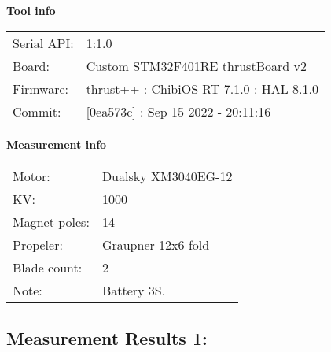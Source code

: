 \documentclass[10pt]{article}
\begin{document}
\noindent
{\large \bf Tool info}
\vspace{3mm}

\noindent
\begin{tabular}{ll}
Serial API:  & 1:1.0\\ 
Board:       & Custom STM32F401RE thrustBoard v2\\ 
Firmware:    & thrust++ : ChibiOS RT 7.1.0 : HAL 8.1.0\\ 
Commit:      & [0ea573c] : Sep 15 2022 - 20:11:16
\end{tabular}
\vspace{3mm}

\noindent
{\large \bf Measurement info}
\vspace{3mm}

\noindent
\begin{tabular}{ll}
Motor:        & Dualsky XM3040EG-12\\ 
KV:           & 1000\\ 
Magnet poles: & 14\\ 
Propeler:     & Graupner 12x6 fold\\ 
Blade count:  & 2\\ 
Note:         & Battery 3S.
\end{tabular}

\vspace{3mm}


\subsection*{\large \bf Measurement Results 1:}
\end{document}
